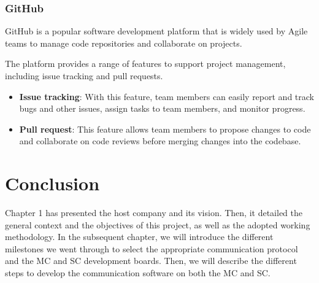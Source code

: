 \subsubsection{GitHub}
GitHub is a popular software development platform that is widely used by Agile teams to manage code repositories and collaborate on projects. 

The platform provides a range of features to support project management, including issue tracking and pull requests.
\begin{itemize}
    \item \textbf{Issue tracking}: With this feature, team members can easily report and track bugs and other issues, assign tasks to team members, and monitor progress.
    
    \item \textbf{Pull request}: This feature allows team members to propose changes to code and collaborate on code reviews before merging changes into the codebase.
\end{itemize}

\section*{Conclusion}
Chapter 1 has presented the host company and its vision. Then, it detailed the general context and the objectives of this project, as well as the adopted working methodology. In the subsequent chapter, we will introduce the different milestones we went through to select the appropriate communication protocol and the MC and SC development boards. Then, we will describe the different steps to develop the communication software on both the MC and SC.